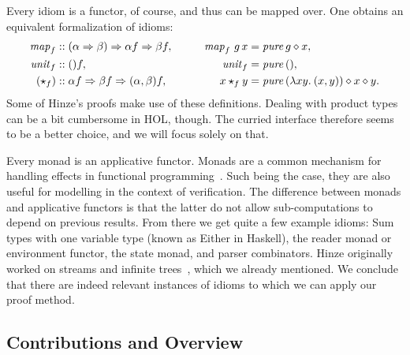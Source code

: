 Every idiom is a functor, of course, and thus can be mapped over.
One obtains an equivalent formalization of idioms:
\begin{alignat*}{2}
	\mathit{map}_f &\mathrel{::} (\alpha \Rightarrow \beta) \Rightarrow \alpha f \Rightarrow \beta f, &\qquad
		\operatorname{\mathit{map}}_f\,g\,x &= \operatorname{\mathit{pure}} g \diamond x, \\
	\mathit{unit}_f &\mathrel{::} () f, &\qquad \mathit{unit}_f &= \operatorname{\mathit{pure}}{()}, \\
	(\star_f) &\mathrel{::} \alpha f \Rightarrow \beta f \Rightarrow (\alpha, \beta) f, &\qquad
		x \star_f y &= \operatorname{\mathit{pure}}{(\lambda x y.\>(x,y))} \diamond x \diamond y.
\end{alignat*}
Some of Hinze's proofs make use of these definitions.
Dealing with product types can be a bit cumbersome in HOL, though.
The curried interface therefore seems to be a better choice, and we will
focus solely on that.

Every monad is an applicative functor.
Monads are a common mechanism for handling effects in functional
programming~\cite{wadler95}.
Such being the case, they are also useful for modelling in the context of
verification.
The difference between monads and applicative functors is that the latter
do not allow sub-computations to depend on previous results.
From there we get quite a few example idioms:
Sum types with one variable type (known as \textsf{Either} in Haskell),
the reader monad or environment functor, the state monad, and parser combinators.
Hinze originally worked on streams and infinite trees~\cite{hinze08,hinze09},
which we already mentioned.
We conclude that there are indeed relevant instances of idioms to which we
can apply our proof method.


\subsection{Contributions and Overview}\label{subsec:contrib-overview}

\todo
